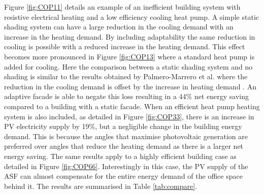 Figure \ref{fig:COP11} details an example of an inefficient building system with resistive electrical heating and a low efficiency cooling heat pump. A simple static shading system can have a large reduction in the cooling demand with an increase in the heating demand. By including adaptability the same reduction in cooling is possible with a reduced increase in the heating demand. This effect becomes more pronounced in Figure \ref{fig:COP13} where a standard heat pump is added for cooling. Here the comparison between a static shading system and no shading is similar to the results obtained by Palmero-Marrero et al. where the reduction in the cooling demand is offset by the increase in heating demand \cite{palmero2010effect}. An adaptive facade is able to negate this loss resulting in a 44\% net energy saving compared to a building with a static facade. When an efficient heat pump heating system is also included, as detailed in Figure \ref{fig:COP33}, there is an increase in PV electricity supply by 19\%, but a negligible change in the building energy demand. This is because the angles that maximise photovoltaic generation are preferred over angles that reduce the heating demand as there is a larger net energy saving. The same results apply to a highly efficient building case as detailed in Figure \ref{fig:COP66}. Interestingly in this case, the PV supply of the ASF can almost compensate for the entire energy demand of the office space behind it. The results are summarised in Table \ref{tab:compare}.


